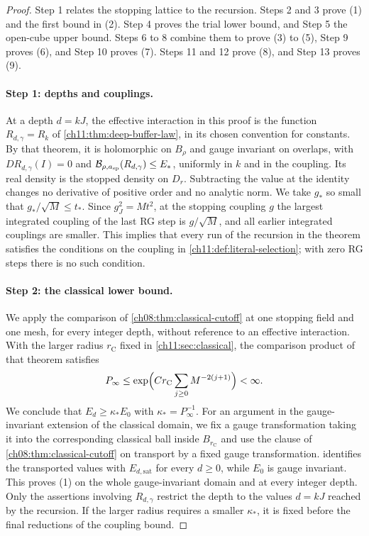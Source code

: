 \begin{proof}
Step 1 relates the stopping lattice to the recursion. Steps 2 and 3 prove (1) and the first bound in (2). Step 4 proves the trial lower bound, and Step 5 the open-cube upper bound. Steps 6 to 8 combine them to prove (3) to (5), Step 9 proves (6), and Step 10 proves (7). Steps 11 and 12 prove (8), and Step 13 proves (9).

\paragraph{Step 1: depths and couplings.}
At a depth $d=kJ$, the effective interaction in this proof is the function $R_{d,\gamma}=R_k$ of \cref{ch11:thm:deep-buffer-law}, in its chosen convention for constants. By that theorem, it is holomorphic on $B_\rho$ and gauge invariant on overlaps, with $DR_{d,\gamma}(I)=0$ and $\mathcal B_{\rho,a_{\mathrm{sp}}}(R_{d,\gamma})\le E_*$, uniformly in $k$ and in the coupling. Its real density is the stopped density on $D_r$. Subtracting the value at the identity changes no derivative of positive order and no analytic norm. We take $g_*$ so small that $g_*/\sqrt M\le t_*$. Since $g_J^2=Mt^2$, at the stopping coupling $g$ the largest integrated coupling of the last RG step is $g/\sqrt M$, and all earlier integrated couplings are smaller. This implies that every run of the recursion in the theorem satisfies the conditions on the coupling in \cref{ch11:def:literal-selection}; with zero RG steps there is no such condition.

\paragraph{Step 2: the classical lower bound.}
We apply the comparison of \cref{ch08:thm:classical-cutoff} at one stopping field and one mesh, for every integer depth, without reference to an effective interaction. With the larger radius $r_{\mathrm C}$ fixed in \cref{ch11:sec:classical}, the comparison product of that theorem satisfies
\[
 P_\infty\le\exp\Bigl(Cr_{\mathrm C}\sum_{j\ge0}M^{-2(j+1)}\Bigr)<\infty.
\]
We conclude that $E_d\ge\kappa_*E_0$ with $\kappa_*=P_\infty^{-1}$. For an argument in the gauge-invariant extension of the classical domain, we fix a gauge transformation taking it into the corresponding classical ball inside $B_{r_{\mathrm C}}$ and use the clause of \cref{ch08:thm:classical-cutoff} on transport by a fixed gauge transformation.  identifies the transported values with $E_{d,\mathrm{sat}}$ for every $d\ge0$, while $E_0$ is gauge invariant. This proves (1) on the whole gauge-invariant domain and at every integer depth. Only the assertions involving $R_{d,\gamma}$ restrict the depth to the values $d=kJ$ reached by the recursion. If the larger radius requires a smaller $\kappa_*$, it is fixed before the final reductions of the coupling bound.


\end{proof}
